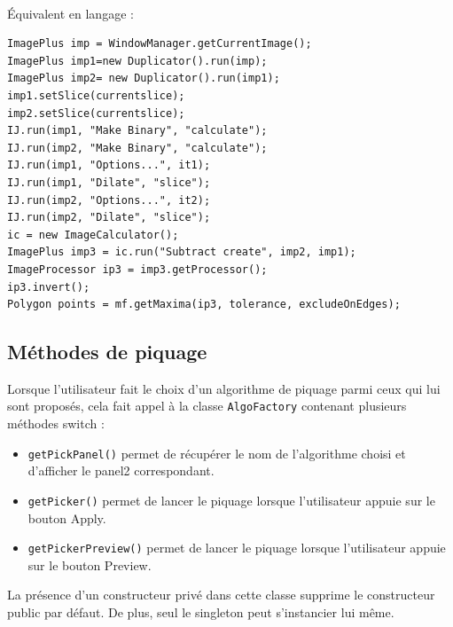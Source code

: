 \paragraph*{}
Équivalent en langage \java :
\begin{center}
\begin{fmpage}{16cm}
\begin{small}
\begin{lstlisting}
ImagePlus imp = WindowManager.getCurrentImage();
ImagePlus imp1=new Duplicator().run(imp);
ImagePlus imp2= new Duplicator().run(imp1);
imp1.setSlice(currentslice);
imp2.setSlice(currentslice);
IJ.run(imp1, "Make Binary", "calculate");
IJ.run(imp2, "Make Binary", "calculate");
IJ.run(imp1, "Options...", it1);
IJ.run(imp1, "Dilate", "slice");
IJ.run(imp2, "Options...", it2);
IJ.run(imp2, "Dilate", "slice");
ic = new ImageCalculator();
ImagePlus imp3 = ic.run("Subtract create", imp2, imp1);
ImageProcessor ip3 = imp3.getProcessor();
ip3.invert();
Polygon points = mf.getMaxima(ip3, tolerance, excludeOnEdges);
\end{lstlisting}
\end{small}	
\end{fmpage}
\end{center}

\subsection{Méthodes de piquage}

Lorsque l'utilisateur fait le choix d'un algorithme de piquage parmi ceux qui lui sont proposés, cela fait appel à la classe \texttt{AlgoFactory} contenant plusieurs méthodes switch :
\begin{itemize}
\item \texttt{getPickPanel()} permet de récupérer le nom de l'algorithme choisi et d'afficher le panel2 correspondant.
\item \texttt{getPicker()} permet de lancer le piquage lorsque l'utilisateur appuie sur le bouton Apply.
\item \texttt{getPickerPreview()} permet de lancer le piquage lorsque l'utilisateur appuie sur le bouton Preview.
\end{itemize}

La présence d'un constructeur privé dans cette classe supprime le constructeur public par défaut. De plus, seul le singleton peut s'instancier lui même. \\

